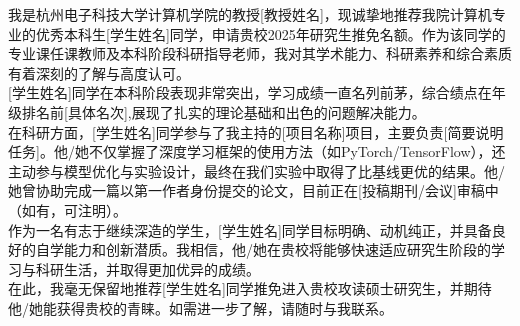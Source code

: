 我是杭州电子科技大学计算机学院的教授[教授姓名]，现诚挚地推荐我院计算机专业的优秀本科生[学生姓名]同学，申请贵校2025年研究生推免名额。作为该同学的专业课任课教师及本科阶段科研指导老师，我对其学术能力、科研素养和综合素质有着深刻的了解与高度认可。\\

[学生姓名]同学在本科阶段表现非常突出，学习成绩一直名列前茅，综合绩点在年级排名前[具体名次],展现了扎实的理论基础和出色的问题解决能力。\\

在科研方面，[学生姓名]同学参与了我主持的[项目名称]项目，主要负责[简要说明任务]。他/她不仅掌握了深度学习框架的使用方法（如PyTorch/TensorFlow），还主动参与模型优化与实验设计，最终在我们实验中取得了比基线更优的结果。他/她曾协助完成一篇以第一作者身份提交的论文，目前正在[投稿期刊/会议]审稿中（如有，可注明）。\\

作为一名有志于继续深造的学生，[学生姓名]同学目标明确、动机纯正，并具备良好的自学能力和创新潜质。我相信，他/她在贵校将能够快速适应研究生阶段的学习与科研生活，并取得更加优异的成绩。\\

在此，我毫无保留地推荐[学生姓名]同学推免进入贵校攻读硕士研究生，并期待他/她能获得贵校的青睐。如需进一步了解，请随时与我联系。\\